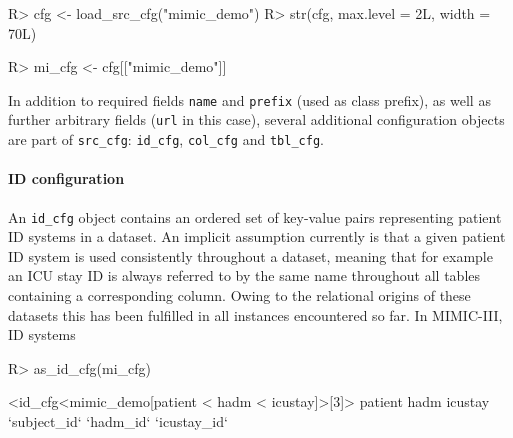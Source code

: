 \documentclass[
  notitle]{jss}
\begin{document}
\begin{CodeChunk}
\begin{CodeInput}
R> cfg <- load_src_cfg("mimic_demo")
R> str(cfg, max.level = 2L, width = 70L)
\end{CodeInput}
\begin{CodeOutput}
List of 1
 $ mimic_demo:List of 6
  ..$ name   : chr "mimic_demo"
  ..$ prefix : chr [1:2] "mimic_demo" "mimic"
  ..$ id_cfg : id_cfg [1:3] `subject_id`, `hadm_id`, `icustay_id`
  ..$ col_cfg: col_cfg [1:25] [0, 0, 5, 0, 1], [0, 1, 6, 0, 1], [1, 0, 0...
  ..$ tbl_cfg: tbl_cfg [1:25] [?? x 19; 1], [?? x 24; 1], [?? x 4; 1], [...
  ..$ extra  :List of 1
  ..- attr(*, "class")= chr [1:3] "mimic_demo_cfg" "mimic_cfg" "src_cfg"
\end{CodeOutput}
\begin{CodeInput}
R> mi_cfg <- cfg[["mimic_demo"]]
\end{CodeInput}
\end{CodeChunk}

In addition to required fields \texttt{name} and \texttt{prefix} (used
as class prefix), as well as further arbitrary fields (\texttt{url} in
this case), several additional configuration objects are part of
\texttt{src\_cfg}: \texttt{id\_cfg}, \texttt{col\_cfg} and
\texttt{tbl\_cfg}.

\hypertarget{id-configuration}{%
\paragraph{ID configuration}\label{id-configuration}}

An \texttt{id\_cfg} object contains an ordered set of key-value pairs
representing patient ID systems in a dataset. An implicit assumption
currently is that a given patient ID system is used consistently
throughout a dataset, meaning that for example an ICU stay ID is always
referred to by the same name throughout all tables containing a
corresponding column. Owing to the relational origins of these datasets
this has been fulfilled in all instances encountered so far. In
MIMIC-III, ID systems

\begin{CodeChunk}
\begin{CodeInput}
R> as_id_cfg(mi_cfg)
\end{CodeInput}
\begin{CodeOutput}
<id_cfg<mimic_demo[patient < hadm < icustay]>[3]>
     patient         hadm      icustay 
`subject_id`    `hadm_id` `icustay_id` 
\end{CodeOutput}
\end{CodeChunk}
\end{document}
